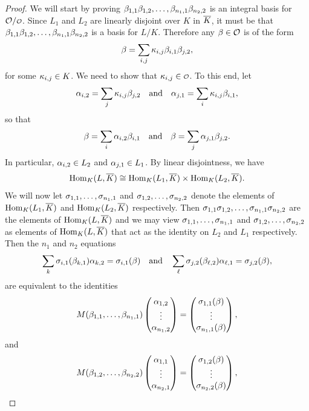     \begin{proof}
      We will start by proving \(\beta_{1,1}\beta_{1,2},\ldots,\beta_{n_{1},1}\beta_{n_{2},2}\) is an integral basis for \(\mc{O}/\smc{O}\). Since \(L_{1}\) and \(L_{2}\) are linearly disjoint over \(K\) in \(\overline{K}\), it must be that \(\beta_{1,1}\beta_{1,2},\ldots,\beta_{n_{1},1}\beta_{n_{2},2}\) is a basis for \(L/K\). Therefore any \(\beta \in \mathcal{O}\) is of the form
      \[
        \beta = \sum_{i,j}\kappa_{i,j}\beta_{i,1}\beta_{j,2},
      \]
      for some \(\kappa_{i,j} \in K\). We need to show that \(\k_{i,j} \in \smc{O}\). To this end, let
      \[
        \alpha_{i,2} = \sum_{j}\kappa_{i,j}\beta_{j,2} \quad \text{and} \quad \alpha_{j,1} = \sum_{i}\kappa_{i,j}\beta_{i,1},
      \]
      so that
      \[
        \beta = \sum_{i}\alpha_{i,2}\beta_{i,1} \quad \text{and} \quad \beta = \sum_{j}\alpha_{j,1}\beta_{j,2}.
      \]
      In particular, \(\alpha_{i,2} \in L_{2}\) and \(\alpha_{j,1} \in L_{1}\). By linear disjointness, we have
      \[
        \operatorname{\mathrm{Hom}}_{K}(L,\overline{K}) \cong \operatorname{\mathrm{Hom}}_{K}(L_{1},\overline{K}) \times \operatorname{\mathrm{Hom}}_{K}(L_{2},\overline{K}).
      \]
      We will now let \(\sigma_{1,1},\ldots,\sigma_{n_{1},1}\) and \(\sigma_{1,2},\ldots,\sigma_{n_{2},2}\) denote the elements of \(\operatorname{\mathrm{Hom}}_{K}(L_{1},\overline{K})\) and \(\operatorname{\mathrm{Hom}}_{K}(L_{2},\overline{K})\) respectively. Then \(\sigma_{1,1}\sigma_{1,2},\ldots,\sigma_{n_{1},1}\sigma_{n_{2},2}\) are the elements of \(\operatorname{\mathrm{Hom}}_{K}(L,\overline{K})\) and we may view \(\sigma_{1,1},\ldots,\sigma_{n_{1},1}\) and \(\sigma_{1,2},\ldots,\sigma_{n_{2},2}\) as elements of \(\operatorname{\mathrm{Hom}}_{K}(L,\overline{K})\) that act as the identity on \(L_{2}\) and \(L_{1}\) respectively. Then the \(n_{1}\) and \(n_{2}\) equations
      \[
        \sum_{k}\sigma_{i,1}(\beta_{k,1})\alpha_{k,2} = \sigma_{i,1}(\beta) \quad \text{and} \quad \sum_{\ell}\sigma_{j,2}(\beta_{\ell,2})\alpha_{\ell,1} = \sigma_{j,2}(\beta),
      \]
      are equivalent to the identities
      \[
        M(\beta_{1,1},\ldots,\beta_{n_{1},1})\begin{pmatrix} \alpha_{1,2} \\ \vdots \\ \alpha_{n_{1},2} \end{pmatrix} = \begin{pmatrix} \sigma_{1,1}(\beta) \\ \vdots \\ \sigma_{n_{1},1}(\beta) \end{pmatrix},
      \]
      and
      \[
        M(\beta_{1,2},\ldots,\beta_{n_{2},2})\begin{pmatrix} \alpha_{1,1} \\ \vdots \\ \alpha_{n_{2},1} \end{pmatrix} = \begin{pmatrix} \sigma_{1,2}(\beta) \\ \vdots \\ \sigma_{n_{2},2}(\beta) \end{pmatrix},
\]
\end{proof}
